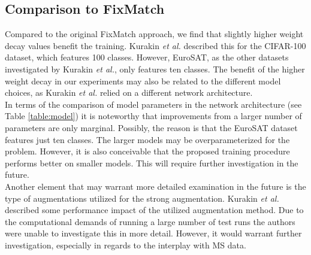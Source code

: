 \documentclass[journal]{IEEEtran}
\newcommand{\etal}{\textit{et al.}}
\begin{document}
\subsection{Comparison to FixMatch}
Compared to the original FixMatch approach, we find that slightly higher weight decay values benefit the training. Kurakin \etal{} \cite{kurakin2020} described this for the CIFAR-100 dataset, which features 100 classes. However, EuroSAT, as the other datasets investigated by Kurakin \etal{}, only features ten classes. The benefit of the higher weight decay in our experiments may also be related to the different model choices, as Kurakin \etal{} relied on a different network architecture. \\
In terms of the comparison of model parameters in the network architecture (see Table \ref{table:model}) it is noteworthy that improvements from a larger number of parameters are only marginal. Possibly, the reason is that the EuroSAT dataset features just ten classes. The larger models may be overparameterized for the problem. However, it is also conceivable that the proposed training procedure performs better on smaller models. This will require further investigation in the future. \\
Another element that may warrant more detailed examination in the future is the type of augmentations utilized for the strong augmentation. Kurakin \etal{} \cite{kurakin2020} described some performance impact of the utilized augmentation method. Due to the computational demands of running a large number of test runs the authors were unable to investigate this in more detail. However, it would warrant further investigation, especially in regards to the interplay with MS data.
\end{document}
